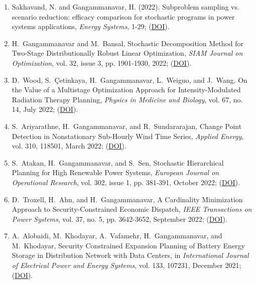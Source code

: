 \documentclass[hyperref, margin]{myResume}
\begin{document}
\begin{resume}
\begin{enumerate}[label=J\arabic*., leftmargin=*]
	\item Sakhavand, N. and Gangammanavar, H. (2022). Subproblem sampling vs. scenario reduction: efficacy comparison for stochastic programs in power systems applications, \textit{Energy Systems}, 1-29; (\href{https://doi.org/10.1007/s12667-022-00558-9}{DOI}).

	\item H.\ Gangammanavar and M.\ Bansal, Stochastic Decomposition Method for Two-Stage Distributionally Robust Linear Optimization, \textit{SIAM Journal on Optimization}, vol. 32, issue 3, pp. 1901-1930, 2022; (\href{https://doi.org/10.1137/20M1378600}{DOI}).
	
	\item D.\ Wood\footnotemark[3], S.\ \c{C}etinkaya, H.\ Gangammanavar, L.\ Weiguo, and J.\ Wang, On the Value of a Multistage Optimization Approach for Intensity-Modulated Radiation Therapy Planning, \textit{Physics in Medicine and Biology}, vol. 67, no. 14, July 2022; (\href{https://doi.org/10.1088/1361-6560/ac7a8a}{DOI}).

	\item S.\ Ariyarathne\footnotemark[1], H.\ Gangammanavar, and R.\ Sundararajan, Change Point Detection in Nonstationary Sub-Hourly Wind Time Series, \textit{Applied Energy}, vol. 310, 118501, March 2022; (\href{https://doi.org/10.1016/j.apenergy.2021.118501}{DOI}).
	
	\item S.\ Atakan, H.\ Gangammanavar, and S.\ Sen, Stochastic Hierarchical Planning for High Renewable Power Systems, \textit{European Journal on Operational Research}, vol. 302, issue 1, pp. 381-391, October 2022; (\href{https://doi.org/10.1016/j.ejor.2021.12.042}{DOI}).
	
	\item D.\ Troxell\footnotemark[2], H.\ Ahn, and H.\ Gangammanavar, A Cardinality Minimization Approach to Security-Constrained Economic Dispatch, \textit{IEEE Transactions on Power Systems}, vol. 37, no. 5, pp. 3642-3652, September 2022; (\href{https://doi.org/10.1109/TPWRS.2021.3133379}{DOI}).

	\item A.\ Alobaidi\footnotemark[3], M.\ Khodayar, A.\ Vafamehr, H.\ Gangammanavar, and M.\ Khodayar, Security Constrained Expansion Planning of Battery Energy Storage in Distribution Network with Data Centers, in \textit{International Journal of Electrical Power and Energy Systems}, vol. 133, 107231, December 2021; (\href{https://doi.org/10.1016/j.ijepes.2021.107231}{DOI}).


\end{enumerate}
\end{resume}
\end{document}
